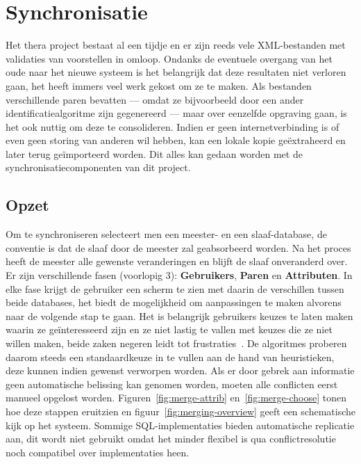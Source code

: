\chapter{Synchronisatie}
\label{hoofdstuk:synchronisatie}
Het thera project bestaat al een tijdje en er zijn reeds vele XML-bestanden met validaties van voorstellen in omloop. Ondanks de eventuele overgang van het oude naar het nieuwe systeem is het belangrijk dat deze resultaten niet verloren gaan, het heeft immers veel werk gekost om ze te maken. Als bestanden verschillende paren bevatten --- omdat ze bijvoorbeeld door een ander identificatiealgoritme zijn gegenereerd --- maar over eenzelfde opgraving gaan, is het ook nuttig om deze te consolideren. Indien er geen internetverbinding is of even geen storing van anderen wil hebben, kan een lokale kopie ge\"extraheerd en later terug ge\"importeerd worden. Dit alles kan gedaan worden met de synchronisatiecomponenten van dit project.

\section{Opzet}
Om te synchroniseren selecteert men een meester- en een slaaf-database, de conventie is dat de slaaf door de meester zal geabsorbeerd worden. Na het proces heeft de meester alle gewenste veranderingen en blijft de slaaf onveranderd over. Er zijn verschillende fasen (voorlopig 3): \textbf{Gebruikers}, \textbf{Paren} en \textbf{Attributen}. In elke fase krijgt de gebruiker een scherm te zien met daarin de verschillen tussen beide databases, het biedt de mogelijkheid om aanpassingen te maken alvorens naar de volgende stap te gaan. Het is belangrijk gebruikers keuzes te laten maken waarin ze ge\"interesseerd zijn en ze niet lastig te vallen met keuzes die ze niet willen maken, beide zaken negeren leidt tot frustraties~\cite{Joel2001}. De algoritmes proberen daarom steeds een standaardkeuze in te vullen aan de hand van heuristieken, deze kunnen indien gewenst verworpen worden. Als er door gebrek aan informatie geen automatische belissing kan genomen worden, moeten alle conflicten eerst manueel opgelost worden. Figuren~\ref{fig:merge-attrib} en~\ref{fig:merge-choose} tonen hoe deze stappen eruitzien en figuur~\ref{fig:merging-overview} geeft een schematische kijk op het systeem. Sommige SQL-implementaties bieden automatische replicatie aan, dit wordt niet gebruikt omdat het minder flexibel is qua conflictresolutie noch compatibel over implementaties heen.\\

